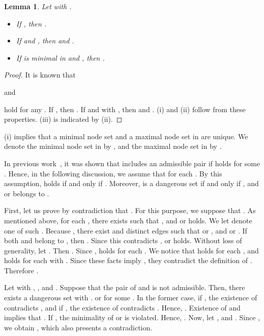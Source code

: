 \documentclass{article}
\newtheorem{lemma}{Lemma}
\begin{document}
\begin{lemma}\label{lemm.uncrossing-core}
 Let  with .
 \begin{itemize}
  \item[\rm (i)] If , then .
  \item[\rm (ii)] If  and , then
	 and .
  \item[\rm (iii)] If  is minimal in  and ,
	then .
 \end{itemize}
\end{lemma}
\begin{proof}
 It is known that
 
 and
  
 hold for any .
 If , then .
 If  and  with ,
 then  and .
  (i) and (ii) follow from these properties.
 (iii) is indicated by (ii).
\end{proof}

(i) implies that a minimal node set and a maximal node set in 
are unique.
We denote the minimal node set in  by , and the maximal
node set in  by .

In previous work~\cite{Nutov2009,Bernath2012}, it was shown that  includes an admissible pair
if  holds for some .
Hence, in the following discussion, we assume that  for each .
By this assumption, 
 holds if and only if . Moreover,
 is a dangerous set if and only if
, and 
 or  belongs to .

First, let us prove by contradiction that .
For this purpose, we suppose that .
As mentioned above, for each , there exists
 such that , and 
or  holds.
We let  denote one of such .
Because ,
there exist  and distinct edges 
such that  or , and
 or .
If both  and   belong to ,
then . Since this contradicts , 
 or  holds.
Without loss of generality, let
.
Then .
Since ,
 holds for each .
We notice that 
holds for each ,
and  holds for each
 with .
Since these facts imply ,
they contradict the definition of .
Therefore .

Let  with , , and
.
Suppose that the pair of  and  is not admissible.
Then, there exists a dangerous set  with .
  or  for some .
In the former case,
if ,
the existence of 
contradicts ,
and 
if ,
the 
existence of 
contradicts .
Hence,
.
Existence of  and  implies that 
.
If , the minimality of  or  is violated.
Hence, . Now, let ,
and .
Since
, 
we obtain , which also presents a contradiction.
\end{document}
